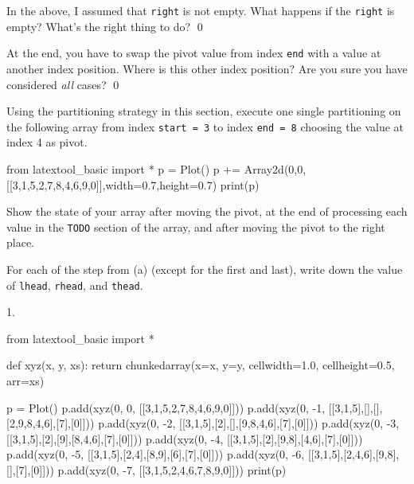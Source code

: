 \newpage
\begin{ex}
In the above, I assumed that \verb!right!
is not empty.
What happens if the \verb!right! is empty?
What's the right thing to do?
\qed
\end{ex}


\newpage
\begin{ex}
At the end, you have to swap the pivot value from index \verb!end! 
with a value at another index position.
Where is this other index position?
Are you sure you have considered \textit{all} cases?
\qed
\end{ex}


\newpage
\begin{ex}
\begin{tightlist}
\item Using the partitioning strategy in this section,
execute one single partitioning on the following array
from index \verb!start = 3! to index \verb!end = 8!
choosing the value at index 4 as pivot.

\begin{python}
from latextool_basic import *
p = Plot()
p += Array2d(0,0,[[3,1,5,2,7,8,4,6,9,0]],width=0.7,height=0.7)
print(p)
\end{python}

Show the state of your array after moving the pivot, at the end of
processing each value in the \verb!TODO! section of the array,
and after moving the pivot to the right place.
\item For each of the step from (a) (except for the first and last),
write down the value of \verb!lhead!, \verb!rhead!, and \verb!thead!.
\end{tightlist}
\end{ex}

\SOLUTION

1.
\begin{python}
from latextool_basic import *

def xyz(x, y, xs):
    return chunkedarray(x=x, y=y, cellwidth=1.0, cellheight=0.5, arr=xs)

p = Plot()
p.add(xyz(0,  0, [[3,1,5,2,7,8,4,6,9,0]]))
p.add(xyz(0, -1, [[3,1,5],[],[],[2,9,8,4,6],[7],[0]]))
p.add(xyz(0, -2, [[3,1,5],[2],[],[9,8,4,6],[7],[0]]))
p.add(xyz(0, -3, [[3,1,5],[2],[9],[8,4,6],[7],[0]]))
p.add(xyz(0, -4, [[3,1,5],[2],[9,8],[4,6],[7],[0]]))
p.add(xyz(0, -5, [[3,1,5],[2,4],[8,9],[6],[7],[0]]))
p.add(xyz(0, -6, [[3,1,5],[2,4,6],[9,8],[],[7],[0]]))
p.add(xyz(0, -7, [[3,1,5,2,4,6,7,8,9,0]]))
print(p)
\end{python}

